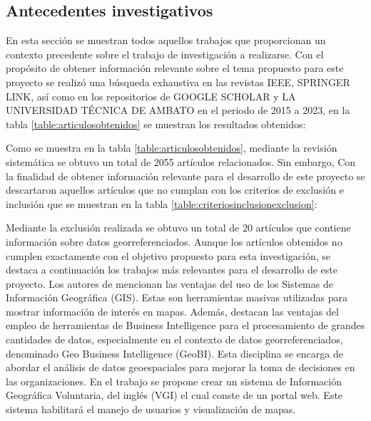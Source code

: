 \subsection{Antecedentes investigativos}
En esta sección se muestran todos aquellos trabajos que proporcionan un contexto
precedente sobre el trabajo de investigación a realizarse.
\bigbreak
Con el propósito de obtener información relevante sobre el tema propuesto para este proyecto se realizó una
búsqueda exhaustiva en las revistas IEEE, SPRINGER LINK, así como en los repositorios de GOOGLE SCHOLAR
y LA UNIVERSIDAD TÉCNICA DE AMBATO en el periodo de 2015 a 2023, en la tabla \ref{table:articulosobtenidos}
se muestran los resultados
obtenidos:

Como se muestra en la tabla \ref{table:articulosobtenidos}, mediante la revisión sistemática se obtuvo un total de 2055 artículos relacionados.
Sin embargo, Con la finalidad de obtener información relevante para el desarrollo de este proyecto se descartaron
aquellos artículos que no cumplan con los criterios de exclusión e inclusión que se muestran en la tabla \ref{table:criteriosinclusionexclusion}:

Mediante la exclusión realizada se obtuvo un total de 20 artículos que contiene información sobre datos georreferenciados.
Aunque los artículos obtenidos no cumplen exactamente con el objetivo propuesto para esta investigación, se destaca a continuación
los trabajos más relevantes para el desarrollo de este proyecto.
\bigbreak
Los autores de \cite{herreraGeoBIBigVGI2015} mencionan las ventajas del uso de los Sistemas de Información Geográfica (GIS).
Estas son herramientas masivas utilizadas para mostrar información de interés en mapas. Además, destacan las ventajas del empleo de
herramientas de Business Intelligence para el procesamiento de grandes cantidades de datos, especialmente en el contexto de
datos georreferenciados, denominado Geo Business Intelligence (GeoBI). Esta disciplina se encarga de abordar el análisis de datos
geoespaciales para mejorar la toma de decisiones en las organizaciones. En el trabajo se propone crear un sistema de Información
Geográfica Voluntaria, del inglés (VGI) el cual conste de un portal web. Este sistema habilitará el manejo de usuarios y visualización de mapas.
